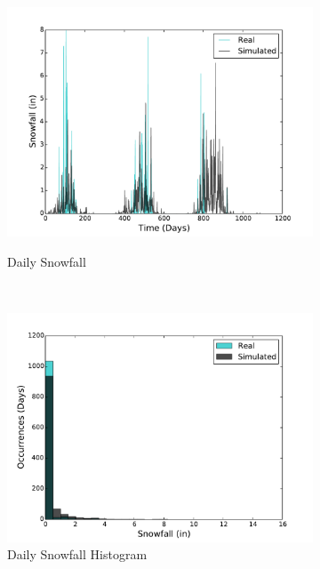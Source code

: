 \documentclass[11pt, letterpaper]{article}
\begin{document}
\begin{figure}[H]
\begin{subfigure}[b]{0.45\textwidth}
    \includegraphics[width=\textwidth]{figures/daily_snowfall.pdf}
    \label{fig:analysis-raw}
    \caption{Daily Snowfall}
  \end{subfigure}
  ~
  \begin{subfigure}[b]{0.45\textwidth}
    \includegraphics[width=\textwidth]{figures/daily_snowfall_hist}
    \caption{Daily Snowfall Histogram}
  \end{subfigure}
  ~
  \begin{subfigure}[b]{0.45\textwidth}

\end{subfigure}
\end{figure}
\end{document}
